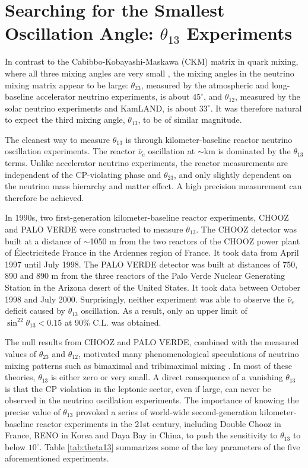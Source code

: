 \section{Searching for the Smallest Oscillation Angle: $\theta_{13}$ Experiments} 
\label{sec:theta13}
In contrast to the  Cabibbo-Kobayashi-Maskawa (CKM) matrix in quark mixing, where all three mixing angles are very small \cite{PDG14}, the mixing angles in the neutrino mixing matrix appear to be large: $\theta_{23}$, measured by the atmospheric \cite{Kajita} and long-baseline accelerator \cite{Feldman} neutrino experiments, is about $45^\circ$, and $\theta_{12}$, measured by the solar neutrino experiments and KamLAND, is about $33^\circ$. It was therefore natural to expect the third mixing angle, $\theta_{13}$, to be of similar magnitude.

The cleanest way to measure $\theta_{13}$ is through kilometer-baseline reactor neutrino oscillation experiments. The reactor $\bar\nu_e$ oscillation at $\sim$km is dominated by the $\theta_{13}$ terms. Unlike accelerator neutrino experiments, the reactor measurements are independent of the CP-violating phase and $\theta_{23}$, and only slightly dependent on the neutrino mass hierarchy and matter effect. A high precision measurement can therefore be achieved.

In 1990s, two first-generation kilometer-baseline reactor experiments, CHOOZ \cite{Chooz} and PALO VERDE \cite{Paloverde} were constructed to measure $\theta_{13}$. 
The CHOOZ detector was built at a distance of $\sim$1050 m from the two reactors of the CHOOZ power plant of \'{E}lectricite\'{d}e France in the Ardennes region of France. It took data from April 1997 until July 1998. 
The PALO VERDE detector was built at distances of 750, 890 and 890 m from the three reactors of the Palo Verde Nuclear Generating Station in the Arizona desert of the United States. It took data between October 1998 and July 2000. 
Surprisingly, neither experiment was able to observe the $\bar\nu_e$ deficit caused by $\theta_{13}$ oscillation. 
As a result, only an upper limit of $\sin^22\theta_{13} < 0.15$ at 90\% C.L. was obtained.

The null results from CHOOZ and PALO VERDE, combined with the measured values of $\theta_{23}$ and $\theta_{12}$, motivated many phenomenological speculations of neutrino mixing patterns such as bimaximal and tribimaximal mixing \cite{Harrison,Altarelli}. 
In most of these theories, $\theta_{13}$ is either zero or very small. 
A direct consequence of a vanishing $\theta_{13}$ is that the CP violation in the leptonic sector, even if large, can never be observed in the neutrino oscillation experiments. 
The importance of knowing the precise value of $\theta_{13}$ provoked a series of world-wide second-generation kilometer-baseline reactor experiments in the 21st century, including Double Chooz \cite{DChooz} in France, RENO \cite{Reno} in Korea and Daya Bay \cite{Dayabay} in China, to push the sensitivity to $\theta_{13}$ to below $10^\circ$. 
Table \ref{tab:theta13} summarizes some of the key parameters of the five aforementioned experiments.


